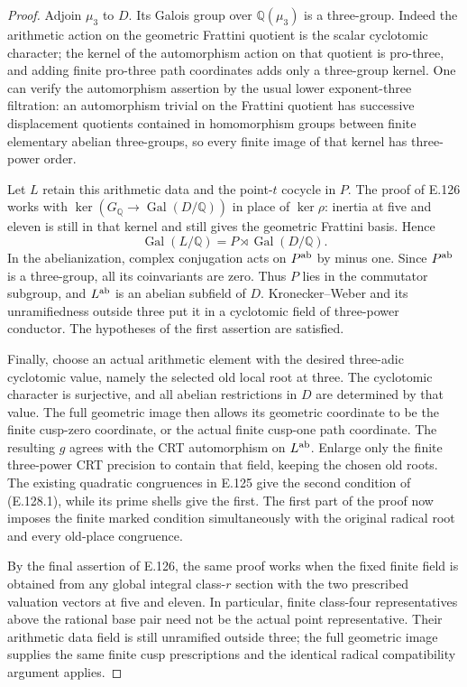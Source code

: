 \begin{proof}
Adjoin $\mu_3$ to $D$. Its Galois group over
$\mathbb Q(\mu_3)$ is a three-group. Indeed the arithmetic
action on the geometric Frattini quotient is the scalar
cyclotomic character; the kernel of the automorphism
action on that quotient is pro-three, and adding finite
pro-three path coordinates adds only a three-group kernel.
One can verify the automorphism assertion by the usual
lower exponent-three filtration: an automorphism trivial
on the Frattini quotient has successive displacement
quotients contained in homomorphism groups between
finite elementary abelian three-groups, so every finite
image of that kernel has three-power order.

Let $L$ retain this arithmetic data and the point-$t$
cocycle in $P$. The proof of E.126 works with $\ker(G_{\mathbb Q}
\to\operatorname{Gal}(D/\mathbb Q))$ in place of $\ker\rho$:
inertia at five and eleven is still in that kernel and
still gives the geometric Frattini basis. Hence
\[
 \operatorname{Gal}(L/\mathbb Q)
      =P\rtimes\operatorname{Gal}(D/\mathbb Q).
\]
In the abelianization, complex conjugation acts on
$P^{\rm ab}$ by minus one. Since $P^{\rm ab}$ is a
three-group, all its coinvariants are zero. Thus $P$
lies in the commutator subgroup, and $L^{\rm ab}$ is
an abelian subfield of $D$. Kronecker--Weber and its
unramifiedness outside three put it in a cyclotomic
field of three-power conductor. The hypotheses of
the first assertion are satisfied.

Finally, choose an actual arithmetic element with the
desired three-adic cyclotomic value, namely the selected
old local root at three. The cyclotomic character is
surjective, and all abelian restrictions in $D$ are
determined by that value. The full geometric image then
allows its geometric coordinate to be the finite cusp-zero
coordinate, or the actual finite cusp-one path coordinate.
The resulting $g$ agrees with the CRT automorphism on
$L^{\rm ab}$. Enlarge only the finite three-power CRT
precision to contain that field, keeping the chosen
old roots. The existing quadratic congruences in E.125
give the second condition of (E.128.1), while its prime
shells give the first. The first part of the proof now
imposes the finite marked condition simultaneously with
the original radical root and every old-place congruence.

By the final assertion of E.126, the same proof works
when the fixed finite field is obtained from any global
integral class-$r$ section with the two prescribed
valuation vectors at five and eleven. In particular,
finite class-four representatives above the rational
base pair need not be the actual point representative.
Their arithmetic data field is still unramified outside
three; the full geometric image supplies the same
finite cusp prescriptions and the identical radical
compatibility argument applies.
\end{proof}

